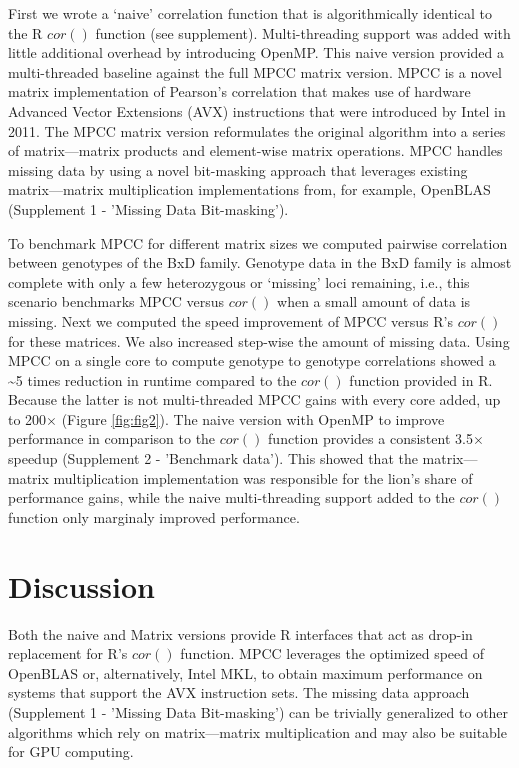 \documentclass{bioinfo}
\begin{document}
First we wrote a `naive' correlation function that is algorithmically
identical to the R $cor()$ function (see supplement). Multi-threading
support was added with little additional overhead by introducing
OpenMP. This naive version provided a multi-threaded baseline against
the full MPCC matrix version.  MPCC is a novel matrix implementation
of Pearson's correlation that makes use of hardware Advanced Vector
Extensions (AVX) instructions that were introduced by Intel in 2011.
The MPCC matrix version reformulates the original algorithm into a
series of matrix---matrix products and element-wise matrix
operations. MPCC handles missing data by using a novel bit-masking
approach that leverages existing matrix---matrix multiplication
implementations from, for example, OpenBLAS (Supplement 1 - 'Missing 
Data Bit-masking').

To benchmark MPCC for different matrix sizes we computed pairwise
correlation between genotypes of the BxD family.  Genotype data in the
BxD family is almost complete with only a few heterozygous or
`missing' loci remaining, i.e., this scenario benchmarks MPCC versus
$cor()$ when a small amount of data is missing.  Next we computed the
speed improvement of MPCC versus R's $cor()$ for these matrices. We
also increased step-wise the amount of missing data. Using MPCC on a 
single core to compute genotype to genotype correlations showed a 
\textasciitilde{}5 times reduction in runtime compared to the $cor()$ 
function provided in R. Because the latter is not multi-threaded MPCC 
gains with every core added, up to 200$\times$ (Figure \ref{fig:fig2}).  
The naive version with OpenMP to improve performance in comparison to 
the $cor()$ function provides a consistent 3.5$\times$ speedup 
(Supplement 2 - 'Benchmark data'). This showed that the matrix---matrix 
multiplication implementation was responsible for the lion's share of 
performance gains, while the naive multi-threading support added to the 
$cor()$ function only marginaly improved performance.

\vspace*{2mm}
\section{Discussion}

Both the naive and Matrix versions provide R interfaces that act as
drop-in replacement for R's $cor()$ function.  MPCC leverages the
optimized speed of OpenBLAS or, alternatively, Intel\textregistered{}
MKL, to obtain maximum performance on systems that support the
AVX instruction sets.  The missing data
approach (Supplement 1 - 'Missing Data Bit-masking') can be trivially
generalized to other algorithms which rely on matrix---matrix
multiplication and may also be suitable for GPU computing.
\end{document}

